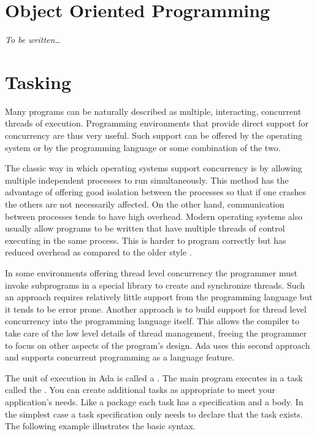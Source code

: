 \section{Object Oriented Programming}

\textit{To be written\ldots}

\section{Tasking}

Many programs can be naturally described as multiple, interacting, concurrent threads of
execution. Programming environments that provide direct support for concurrency are thus very
useful. Such support can be offered by the operating system or by the programming language or
some combination of the two.

The classic way in which operating systems support concurrency is by allowing multiple
independent processes to run simultaneously. This method has the advantage of offering good
isolation between the processes so that if one crashes the others are not necessarily affected.
On the other hand, communication between processes tends to have high overhead. Modern operating
systems also usually allow programs to be written that have multiple threads of control
executing in the same process. This  is harder to program
correctly but has reduced overhead as compared to the older style .

In some environments offering thread level concurrency the programmer must invoke subprograms in
a special library to create and synchronize threads. Such an approach requires relatively little
support from the programming language but it tends to be error prone. Another approach is to
build support for thread level concurrency into the programming language itself. This allows the
compiler to take care of the low level details of thread management, freeing the programmer to
focus on other aspects of the program's design. Ada uses this second approach and supports
concurrent programming as a language feature.

The unit of execution in Ada is called a . The main program executes in a task
called the . You can create additional tasks as appropriate to meet
your application's needs. Like a package each task has a specification and a body. In the
simplest case a task specification only needs to declare that the task exists. The following
example illustrates the basic syntax.

